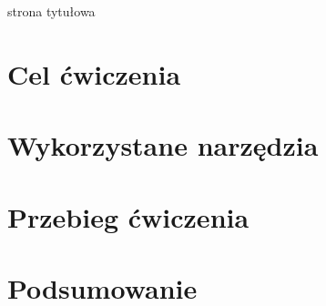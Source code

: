 \documentclass[11pt, a4paper]{article}
\begin{document}
\begin{center}
strona tytułowa	
\end{center}

	
\newpage
	
\section{Cel ćwiczenia}
\normalsize


	
\section{Wykorzystane narzędzia}



\section{Przebieg ćwiczenia}



\section{Podsumowanie}
	
	
	
	
	
	
\end{document}
